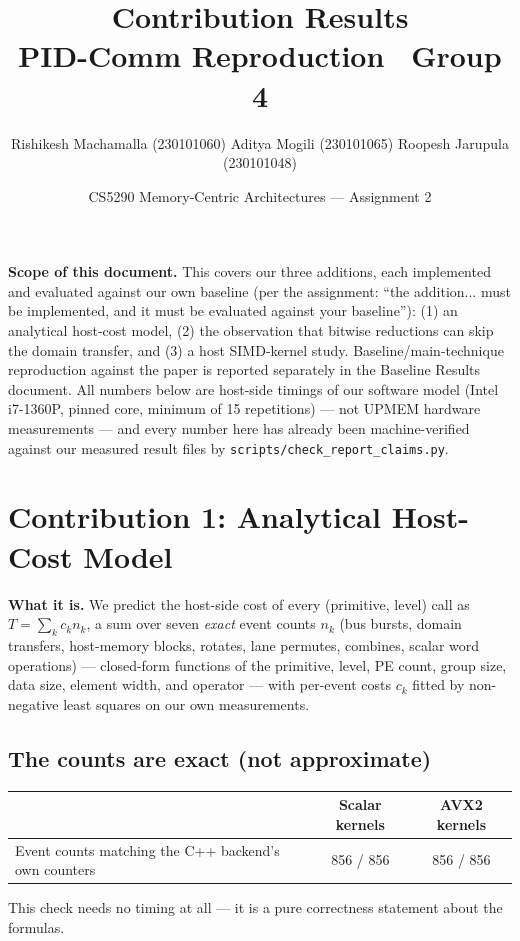 \documentclass[11pt]{article}
\title{\vspace{-1.5em}Contribution Results\\\large PID-Comm Reproduction \textemdash\ Group 4}
\author{Rishikesh Machamalla (230101060) \quad Aditya Mogili (230101065) \quad Roopesh Jarupula (230101048)}
\date{CS5290 Memory-Centric Architectures --- Assignment 2}
\begin{document}
\maketitle
\vspace{-1.5em}

\noindent\textbf{Scope of this document.} This covers our three additions, each implemented and evaluated against our own baseline (per the assignment: ``the addition... must be implemented, and it must be evaluated against your baseline''): (1) an analytical host-cost model, (2) the observation that bitwise reductions can skip the domain transfer, and (3) a host SIMD-kernel study. Baseline/main-technique reproduction against the paper is reported separately in the Baseline Results document. All numbers below are host-side timings of our software model (Intel i7-1360P, pinned core, minimum of 15 repetitions) --- not UPMEM hardware measurements --- and every number here has already been machine-verified against our measured result files by \texttt{scripts/check\_report\_claims.py}.

\section{Contribution 1: Analytical Host-Cost Model}
\textbf{What it is.} We predict the host-side cost of every (primitive, level) call as $T=\sum_k c_k n_k$, a sum over seven \emph{exact} event counts $n_k$ (bus bursts, domain transfers, host-memory blocks, rotates, lane permutes, combines, scalar word operations) --- closed-form functions of the primitive, level, PE count, group size, data size, element width, and operator --- with per-event costs $c_k$ fitted by non-negative least squares on our own measurements.

\subsection{The counts are exact (not approximate)}
\begin{center}\small
\begin{tabular}{@{}lcc@{}}\toprule
 & Scalar kernels & AVX2 kernels \\\midrule
Event counts matching the C++ backend's own counters & 856 / 856 & 856 / 856 \\
\bottomrule
\end{tabular}
\end{center}
This check needs no timing at all --- it is a pure correctness statement about the formulas.
\end{document}
